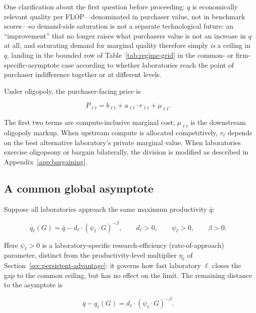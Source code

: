 \documentclass[11pt]{article}
\begin{document}
One clarification about the first question before proceeding: $q$ is economically relevant quality per FLOP---denominated in purchaser value, not in benchmark scores---so demand-side saturation is not a separate technological future: an ``improvement'' that no longer raises what purchasers value is not an increase in $q$ at all, and saturating demand for marginal quality therefore simply \emph{is} a ceiling in $q$, landing in the bounded row of Table~\ref{tab:regime-grid} in the common- or firm-specific-asymptote case according to whether laboratories reach the point of purchaser indifference together or at different levels.

Under oligopoly, the purchaser-facing price is

\begin{equation}P_{\ell t}=b_{\ell t}+a_{\ell t}\cdot r_{\ell t}+\mu_{\ell t}.\end{equation}

The first two terms are compute-inclusive marginal cost; $\mu_{\ell t}$ is the downstream oligopoly markup. When upstream compute is allocated competitively, $r_t$ depends on the best alternative laboratory's private marginal value. When laboratories exercise oligopsony or bargain bilaterally, the division is modified as described in Appendix~\ref{app:bargaining}.

\subsection{A common global asymptote}
\label{subsec:common-asymptote}

Suppose all laboratories approach the same maximum productivity $\bar q$:

\begin{equation}q_\ell(G)=\bar q-d_\ell\cdot(\psi_\ell\cdot G)^{-\beta},\qquad d_\ell>0,\qquad \psi_\ell>0,\qquad \beta>0.\end{equation}

Here $\psi_\ell>0$ is a laboratory-specific research-efficiency (rate-of-approach) parameter, distinct from the productivity-level multiplier $\eta_\ell$ of Section~\ref{sec:persistent-advantage}: it governs how fast laboratory $\ell$ closes the gap to the common ceiling, but has no effect on the limit. The remaining distance to the asymptote is

\begin{equation}\bar q-q_\ell(G)=d_\ell\cdot(\psi_\ell\cdot G)^{-\beta}.\end{equation}
\end{document}
